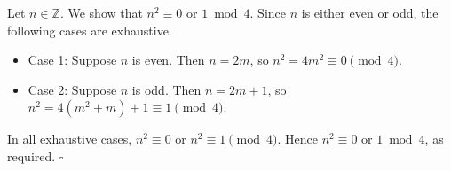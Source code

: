 Let $n \in \mathbb{Z}$.
We show that $n^{2} \equiv 0$ or $1 \bmod 4$.
Since $n$ is either even or odd, the following cases are exhaustive.

\begin{itemize}
  \item Case 1: Suppose $n$ is even.
    Then $n = 2m$, so $n^{2} = 4m^{2} \equiv 0 \pmod{4}$.
  \item Case 2: Suppose $n$ is odd.
    Then $n = 2m + 1$, so $n^{2} = 4(m^{2} + m) + 1 \equiv 1 \pmod{4}$.
\end{itemize}

In all exhaustive cases, $n^{2} \equiv 0$ or $n^{2} \equiv 1 \pmod{4}$.
Hence $n^{2} \equiv 0$ or $1 \bmod 4$, as required. \hfill$\square$
